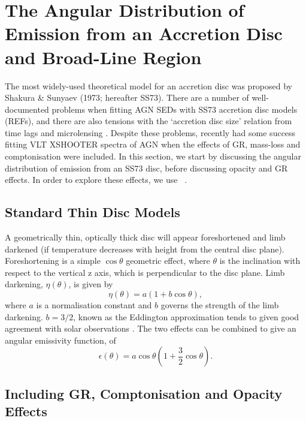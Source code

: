 \section{The Angular Distribution of Emission from an Accretion Disc and Broad-Line Region}
\label{disc}

\noindent 
The most widely-used theoretical model for an accretion disc
was proposed by Shakura \& Sunyaev (1973; hereafter SS73). 
\nocite{shakurasunyaev1973}
There are a number of well-documented problems when fitting 
AGN SEDs with SS73 accretion disc models (REFs), and there are also 
tensions with the `accretion disc size' relation from time lags \citep{edelson2015}
and microlensing \citep{morgan2010}. Despite these problems, 
\cite{capellupo2015} recently had 
some success fitting VLT XSHOOTER spectra of AGN when the effects of
GR, mass-loss and comptonisation were included.
In this section, we start by discussing the angular distribution of
emission from an SS73 disc, before discussing opacity and GR 
effects. In order to explore these effects, we use \agn\
\citep{hubeny2000,davishubeny2006,davis2007}.

\subsection{Standard Thin Disc Models}

\noindent
A geometrically thin, optically thick disc will appear
foreshortened and limb darkened (if temperature decreases
with height from the central disc plane). 
Foreshortening is a simple $\cos \theta$ geometric effect, 
where $\theta$ is the inclination with respect to the vertical z axis, which
is perpendicular to the disc plane.
Limb darkening, $\eta(\theta)$, is given by
\begin{equation}
\eta(\theta) = a \left( 1 + b \cos \theta \right),
\end{equation}
where $a$ is a normalisation constant and $b$ governs the strength
of the limb darkening. $b=3/2$, known as the Eddington approximation
tends to given good agreement with solar observations 
\citep[e.g.][]{mihalas}. The two effects can be 
combined to give an angular emissivity function, of
\begin{equation}
\epsilon(\theta) = a \cos \theta \left( 1 + \frac{3}{2} \cos \theta \right).
\end{equation}

\subsection{Including GR, Comptonisation and Opacity Effects}

